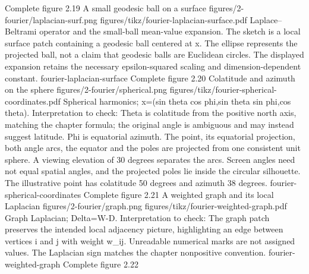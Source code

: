 {Complete figure}
{2.19}
{A small geodesic ball on a surface}
{figures/2-fourier/laplacian-surf.png}
{figures/tikz/fourier-laplacian-surface.pdf}
{Laplace--Beltrami operator and the small-ball mean-value expansion.}
{The sketch is a local surface patch containing a geodesic ball centered at x. The ellipse represents the projected ball, not a claim that geodesic balls are Euclidean circles. The displayed expansion retains the necessary epsilon-squared scaling and dimension-dependent constant.}
{fourier-laplacian-surface}
{Complete figure}
{2.20}
{Colatitude and azimuth on the sphere}
{figures/2-fourier/spherical.png}
{figures/tikz/fourier-spherical-coordinates.pdf}
{Spherical harmonics; x=(sin theta cos phi,sin theta sin phi,cos theta).}
{Interpretation to check: Theta is colatitude from the positive north axis, matching the chapter formula; the original angle is ambiguous and may instead suggest latitude. Phi is equatorial azimuth. The point, its equatorial projection, both angle arcs, the equator and the poles are projected from one consistent unit sphere. A viewing elevation of 30 degrees separates the arcs. Screen angles need not equal spatial angles, and the projected poles lie inside the circular silhouette. The illustrative point has colatitude 50 degrees and azimuth 38 degrees.}
{fourier-spherical-coordinates}
{Complete figure}
{2.21}
{A weighted graph and its local Laplacian}
{figures/2-fourier/graph.png}
{figures/tikz/fourier-weighted-graph.pdf}
{Graph Laplacian; Delta=W-D.}
{Interpretation to check: The graph patch preserves the intended local adjacency picture, highlighting an edge between vertices i and j with weight w\_ij. Unreadable numerical marks are not assigned values. The Laplacian sign matches the chapter nonpositive convention.}
{fourier-weighted-graph}
{Complete figure}
{2.22}
